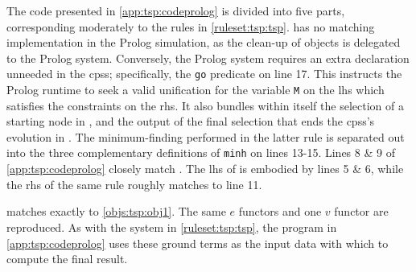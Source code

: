 The code presented in \cref{app:tsp:codeprolog} is divided into five parts, corresponding moderately to the rules in \cref{ruleset:tsp:tsp}.   has no matching implementation in the Prolog simulation, as the clean-up of objects is delegated to the Prolog system.  Conversely, the Prolog system requires an extra declaration unneeded in the \glspl{cps}; specifically, the \texttt{go} predicate on line 17.  This instructs the Prolog runtime to seek a valid unification for the variable \texttt{M} on the \gls{lhs} which satisfies the constraints on the \gls{rhs}.  It also bundles within itself the selection of a starting node in , and the output of the final selection that ends the \glspl{cps}'s evolution in .  The minimum-finding performed in the latter rule is separated out into the three complementary definitions of \texttt{minh} on lines 13-15.  Lines 8 \& 9 of \cref{app:tsp:codeprolog} closely match .  The \gls{lhs} of  is embodied by lines 5 \& 6, while the \gls{rhs} of the same rule roughly matches to line 11.



 matches exactly to \cref{objs:tsp:obj1}.  The same \(e\) functors and one \(v\) functor are reproduced.  As with the system in \cref{ruleset:tsp:tsp}, the program in \cref{app:tsp:codeprolog} uses these ground terms as the input data with which to compute the final result.